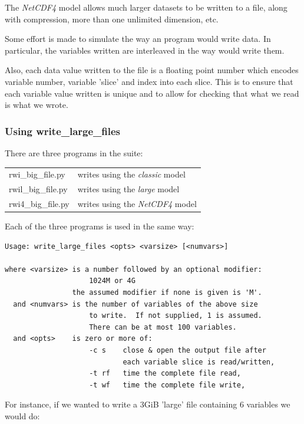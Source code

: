\documentclass{manual}
\begin{document}
The \emph{NetCDF4} model allows much larger datasets to be written to a file, along
with compression, more than one unlimited dimension, etc.

Some effort is made to simulate the way an \anuga program would write data.  In  particular,
the variables written are interleaved in the way \anuga would write them.

Also, each data value written to the file is a floating point number which encodes
variable number, variable 'slice' and index into each slice.  This is to ensure that 
each variable value written is unique and to allow for checking that what we read is what we wrote.

\subsubsection{Using write_large_files}
\label{subsubsec:write_large_files_use}

There are three programs in the  suite:

\begin{tabular}{ l l }
  rwi_big_file.py & writes using the \emph{classic} model \\
  rwil_big_file.py & writes using the \emph{large} model \\
  rwi4_big_file.py & writes using the \emph{NetCDF4} model \\
\end{tabular}

Each of the three programs is used in the same way:

\begin{verbatim}
Usage: write_large_files <opts> <varsize> [<numvars>]

where <varsize> is a number followed by an optional modifier:
                    1024M or 4G
                the assumed modifier if none is given is 'M'.
  and <numvars> is the number of variables of the above size
                    to write.  If not supplied, 1 is assumed.
                    There can be at most 100 variables.
  and <opts>    is zero or more of:
                    -c s    close & open the output file after
                            each variable slice is read/written,
                    -t rf   time the complete file read,
                    -t wf   time the complete file write,
\end{verbatim}

For instance, if we wanted to write a 3GiB 'large' file containing 6 variables we would do:
\end{document}
